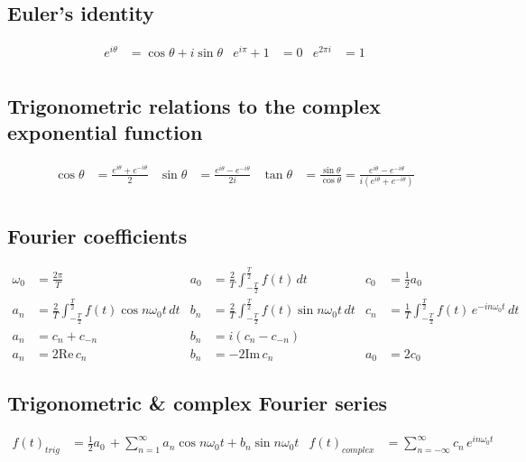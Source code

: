 \subsection*{Euler's identity}
\begin{align*}
  e^{i\theta } &= \cos{\theta} +i\sin{\theta} & e^{i\pi}+1&= 0 & e^{2\pi i} &= 1\\
\end{align*}

\subsection*{Trigonometric relations to the complex exponential function}
\begin{align*}
  \cos{\theta} &= \frac{e^{i\theta}+e^{-i\theta}}{2}
  &\sin{\theta} &= \frac{e^{i\theta}-e^{-i\theta}}{2i}
  &\tan{\theta} &= \frac{\sin{\theta}}{\cos{\theta}} = \frac{e^{i\theta}-e^{-i\theta}}{i(e^{i\theta}+e^{-i\theta})}\\
\end{align*}

\subsection*{Fourier coefficients}
\begin{align*}
  \omega_0 &= \frac{2\pi}{T}
  &a_0 &= \frac{2}{T}\int_{-\frac{T}{2}}^{\frac{T}{2}} f(t) \,dt
  &c_0 &= \frac{1}{2}a_0\\
  a_n &= \frac{2}{T}\int_{-\frac{T}{2}}^{\frac{T}{2}}f(t)\cos{n\omega_0t} \,dt
  &b_n &= \frac{2}{T}\int_{-\frac{T}{2}}^{\frac{T}{2}}f(t)\sin{n\omega_0t} \,dt
  &c_n &= \frac{1}{T}\int_{-\frac{T}{2}}^{\frac{T}{2}}f(t)\,e^{-in\omega_0t} \,dt \\
  a_n &= c_n+c_{-n}
  &b_n &= i(c_n-c_{-n}) \\
  a_n &= 2\textrm{Re}\,c_n
  &b_n &= -2\textrm{Im}\,c_n
  &a_0 &= 2c_0
\end{align*}

\subsection*{Trigonometric \& complex Fourier series}
\begin{align*}
  f(t)_{trig} &= \frac{1}{2}a_0 \,+ \sum_{n=1}^{\infty} a_n\cos{n\omega_0t} + b_n\sin{n\omega_0t}
  &f(t)_{complex} &= \sum_{n=-\infty}^{\infty} c_n \,e^{in\omega_0t}
\end{align*}
